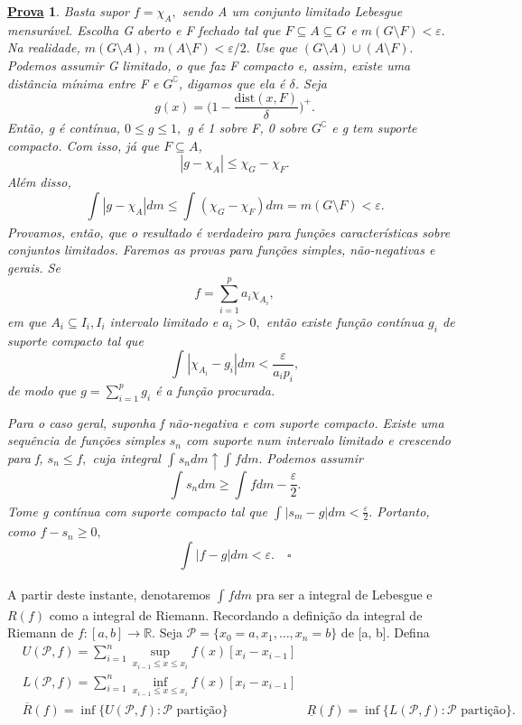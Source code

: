 \documentclass{article}
\newtheorem*{proof*}{\underline{Prova}}
\begin{document}
\begin{proof*}
  Basta supor \(f=\chi_{A},\) sendo A um conjunto limitado Lebesgue mensurável. Escolha G aberto e F fechado tal que \(F\subseteq A\subseteq G\) e \(m(G\setminus{F}) < \varepsilon.\) Na realidade,
  \(m(G\setminus{A}),\) \(m(A\setminus{F}) < \varepsilon /2.\) Use que \((G\setminus{A})\cup (A\setminus{F}).\) Podemos assumir G limitado, o que faz F compacto e, assim, existe uma distância mínima entre F e \(G^{\complement}\), digamos que ela é \(\delta \). Seja 
    \[
      g(x) = \biggl(1 - \frac{\mathrm{dist}(x, F)}{\delta }\biggr)^{+}.
    \]
  Então, g é contínua, \(0\leq g \leq 1, \) g é 1 sobre F, 0 sobre \(G ^{\complement}\) e g tem suporte compacto. Com isso, já que \(F\subseteq A\),
    \[
      |g- \chi_{A}|\leq \chi_{G} - \chi_{F}.
    \]
  Além disso,
    \[
      \int_{}|g-\chi_{A}| dm \leq \int_{}(\chi_{G} - \chi_{F}) dm = m(G\setminus{F})<\varepsilon .
    \]
  Provamos, então, que o resultado é verdadeiro para funções características sobre conjuntos limitados. Faremos as provas para funções simples, não-negativas e gerais. Se 
    \[
      f= \sum\limits_{i=1}^{p}a_{i}\chi_{A_{i}},
    \]
  em que \(A_{i}\subseteq I_{i}, I_{i}\) intervalo limitado e \(a_{i} > 0,\) então existe função contínua \(g_{i}\) de suporte compacto tal que 
    \[
      \int_{}|\chi_{A_{i}} - g_{i}| dm < \frac{\varepsilon }{a_{i}p_{i}},
    \]
  de modo que \(g=\sum\limits_{i=1}^{p}g_{i}\) é a função procurada. 

  Para o caso geral, suponha f não-negativa e com suporte compacto. Existe uma sequência de funções simples \(s_{n}\) com suporte num intervalo limitado e crescendo
para f, \(s_{n}\leq f,\) cuja integral \(\int_{}s_{n} dm \uparrow \int_{}f dm.\) Podemos assumir 
  \[
    \int_{}s_{n} dm \geq \int_{}f dm - \frac{\varepsilon }{2}.
  \]
  Tome g contínua com suporte compacto tal que \(\int_{}|s_{m} - g| dm < \frac{\varepsilon }{2}.\) Portanto, como \(f - s_{n}\geq 0,\)
    \[
      \int_{}|f-g| dm < \varepsilon .\quad \square
    \]
\end{proof*}
  A partir deste instante, denotaremos \(\int_{}f dm\) pra ser a integral de Lebesgue e \(R(f)\) como a integral de Riemann. Recordando a definição da integral de Riemann de \(f:[a, b]\rightarrow \mathbb{R}.\) Seja \(\mathcal{P} = \{x_{0} = a, x_1, \dotsc , x_{n} = b\}\) de [a, b]. 
  Defina 
 \begin{align*}
   &U(\mathcal{P}, f) = \sum\limits_{i=1}^{n}\sup_{x_{i-1}\leq x \leq x_{i}}f(x)[x_{i} - x_{i-1}]\\
   &L(\mathcal{P}, f) = \sum\limits_{i=1}^{n}\inf_{x_{i-1}\leq x \leq x_{i}}f(x)[x_{i} - x_{i-1}]\\
   &\overline{R}(f) = \inf_{}\{U(\mathcal{P}, f): \mathcal{P} \text{ partição}\}
   &\underline{R}(f) = \inf_{}\{L(\mathcal{P}, f): \mathcal{P} \text{ partição}\}.
 \end{align*}
\end{document}

